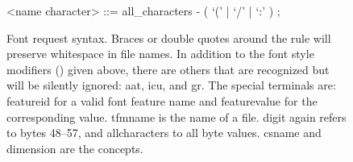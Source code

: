 \begin {figure} [b]
\begin{grammar}
      <name character>   ::= {\sc all_characters} - ( `(' | `/' | `:' ) ;
    \end{grammar}
  \endgroup
  \caption{Font request syntax.
           Braces or double quotes around the
            rule will
           preserve whitespace in file names.
           In addition to the font style modifiers
           () given above, there
           are others that are recognized but will be silently
           ignored: {\ttfamily aat},
                    {\ttfamily icu}, and
                    {\ttfamily gr}.
           The special terminals are:
           {\sc feature\textunderscore id} for a valid font
              feature name and
           {\sc feature\textunderscore value} for the corresponding
              value.
           {\sc tfmname} is the name of a  file.
           {\sc digit}  again refers to bytes 48--57, and
           {\sc all\textunderscore characters} to all byte values.
           {\sc csname} and {\sc dimension} are the \TEX concepts.}
  \label{font-syntax}
\end {figure}


